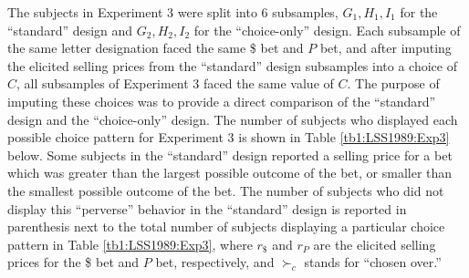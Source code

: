 \documentclass[../main.tex]{subfiles}
\begin{document}
{\begin{table}[hp!]
\begin{tabularx}{\textwidth}{cccYYYYYYYY}
	\end{tabularx}
\end{table}
\clearpage
}

The subjects in Experiment 3 were split into 6 subsamples, $G_1,H_1,I_1$ for the \enquote{standard} design and $G_2,H_2,I_2$ for the \enquote{choice-only} design.
Each subsample of the same letter designation faced the same {\$} bet and $P$ bet, and after imputing the elicited selling prices from the \enquote{standard} design subsamples into a choice of $C$, all subsamples of Experiment 3 faced the same value of $C$.
The purpose of imputing these choices was to provide a direct comparison of the \enquote{standard} design and the  \enquote{choice-only} design.
The number of subjects who displayed each possible choice pattern for Experiment 3 is shown in Table \ref{tb1:LSS1989:Exp3} below.
Some subjects in the \enquote{standard} design reported a selling price for a bet which was greater than the largest possible outcome of the bet, or smaller than the smallest possible outcome of the bet.
The number of subjects who did not display this \enquote{perverse} behavior in the \enquote{standard} design is reported in parenthesis next to the total number of subjects displaying a particular choice pattern in Table \ref{tb1:LSS1989:Exp3}, where $r_{\$}$ and $r_P$ are the elicited selling prices for the {\$} bet and $P$ bet, respectively, and $\succ_c$ stands for \enquote{chosen over.}
\end{document}
